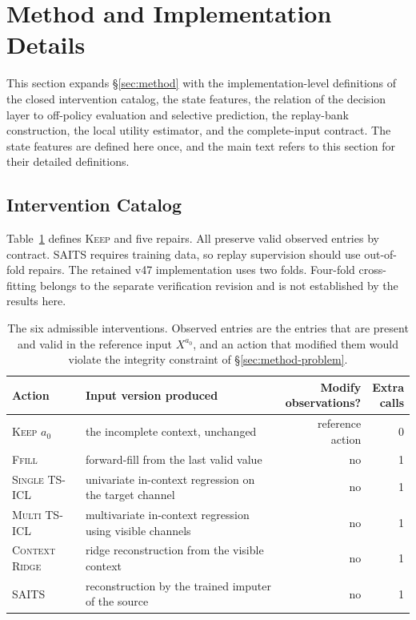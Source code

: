 \documentclass{article}
\begin{document}
\section{Method and Implementation Details}
\label{app:method-details}

This section expands \S\ref{sec:method} with the implementation-level definitions of the
closed intervention catalog, the state features, the relation of the decision layer to
off-policy evaluation and selective prediction, the replay-bank construction, the local
utility estimator, and the complete-input contract. The state features are defined here
once, and the main text refers to this section for their detailed definitions.

\subsection{Intervention Catalog}
\label{app:catalog}
Table~\ref{tab:app-catalog} defines \textsc{Keep} and five repairs. All preserve valid observed
entries by contract. SAITS requires training data, so replay supervision should use
out-of-fold repairs. The retained v47 implementation uses two folds. Four-fold cross-fitting
belongs to the separate verification revision and is not established by the results here.

\begin{table}[htbp]
  \caption{The six admissible interventions. Observed entries are the entries that are
  present and valid in the reference input $X^{a_0}$, and an action that modified them would
  violate the integrity constraint of \S\ref{sec:method-problem}.}
  \label{tab:app-catalog}
  \centering
  \small
  \setlength{\tabcolsep}{4pt}
\begin{tabularx}{\textwidth}{@{}lXrr@{}}
    \toprule
    Action & Input version produced & \shortstack[r]{Modify\\observations?} & \shortstack[r]{Extra\\calls} \\
    \midrule
    \textsc{Keep} $a_0$   & the incomplete context, unchanged & reference action & 0 \\
    \textsc{Ffill}        & forward-fill from the last valid value & no & 1 \\
    \textsc{Single TS-ICL}& univariate in-context regression on the target channel & no & 1 \\
    \textsc{Multi TS-ICL} & multivariate in-context regression using visible channels & no & 1 \\
    \textsc{Context Ridge}& ridge reconstruction from the visible context & no & 1 \\
    \textsc{SAITS}        & reconstruction by the trained imputer of the source & no & 1 \\
    \bottomrule
  \end{tabularx}
\end{table}
\end{document}

